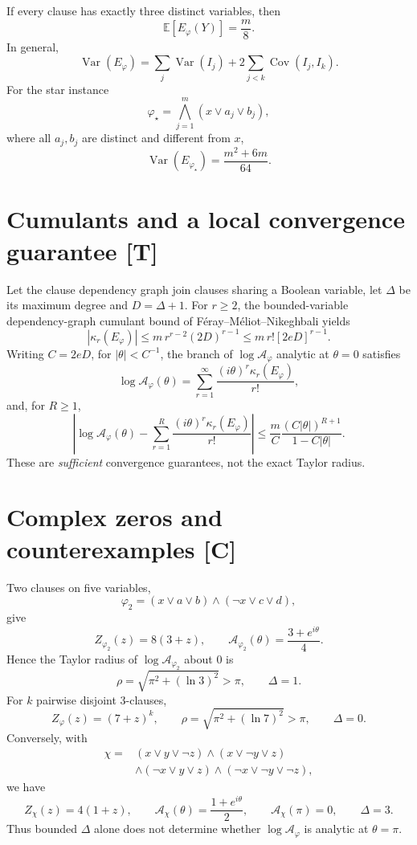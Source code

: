\documentclass[11pt]{article}
\newcommand{\E}{\mathbb{E}}
\DeclareMathOperator{\Var}{Var}
\DeclareMathOperator{\Cov}{Cov}
\begin{document}
If every clause has exactly three distinct variables, then
\[
\E[E_\varphi(Y)]=\frac m8.
\]
In general,
\[
\Var(E_\varphi)
=\sum_j\Var(I_j)+2\sum_{j<k}\Cov(I_j,I_k).
\]
For the star instance
\[
\varphi_\star=\bigwedge_{j=1}^{m}(x\lor a_j\lor b_j),
\]
where all $a_j,b_j$ are distinct and different from $x$,
\[
\Var(E_{\varphi_\star})
=\frac{m^2+6m}{64}.
\]

\section{Cumulants and a local convergence guarantee [T]}
Let the clause dependency graph join clauses sharing a Boolean
variable, let $\Delta$ be its maximum degree and $D=\Delta+1$.
For $r\ge2$, the bounded-variable dependency-graph cumulant
bound of F\'eray--M\'eliot--Nikeghbali yields
\[
|\kappa_r(E_\varphi)|
\le m\,r^{r-2}(2D)^{r-1}
\le m\,r![2eD]^{r-1}.
\]
Writing $C=2eD$, for $|\theta|<C^{-1}$, the branch of
$\log\mathcal{A}_\varphi$ analytic at $\theta=0$ satisfies
\[
\log\mathcal{A}_\varphi(\theta)
=\sum_{r=1}^{\infty}
\frac{(i\theta)^r\kappa_r(E_\varphi)}{r!},
\]
and, for $R\ge1$,
\[
\left|
\log\mathcal{A}_\varphi(\theta)
-\sum_{r=1}^{R}
\frac{(i\theta)^r\kappa_r(E_\varphi)}{r!}
\right|
\le
\frac{m}{C}
\frac{(C|\theta|)^{R+1}}{1-C|\theta|}.
\]
These are \emph{sufficient} convergence guarantees,
not the exact Taylor radius.

\section{Complex zeros and counterexamples [C]}
Two clauses on five variables,
\[
\varphi_2=(x\lor a\lor b)\land(\neg x\lor c\lor d),
\]
give
\[
Z_{\varphi_2}(z)=8(3+z),\qquad
\mathcal{A}_{\varphi_2}(\theta)=\frac{3+e^{i\theta}}4.
\]
Hence the Taylor radius of $\log\mathcal{A}_{\varphi_2}$
about $0$ is
\[
\rho=\sqrt{\pi^2+(\ln3)^2}>\pi,
\qquad\Delta=1.
\]
For $k$ pairwise disjoint 3-clauses,
\[
Z_\varphi(z)=(7+z)^k,\qquad
\rho=\sqrt{\pi^2+(\ln7)^2}>\pi,\qquad\Delta=0.
\]
Conversely, with
\[
\begin{aligned}
\chi={}&(x\lor y\lor\neg z)
\land(x\lor\neg y\lor z)\\
&\land(\neg x\lor y\lor z)
\land(\neg x\lor\neg y\lor\neg z),
\end{aligned}
\]
we have
\[
Z_\chi(z)=4(1+z),\qquad
\mathcal{A}_\chi(\theta)=\frac{1+e^{i\theta}}2,\qquad
\mathcal{A}_\chi(\pi)=0,\qquad\Delta=3.
\]
Thus bounded $\Delta$ alone does not determine whether
$\log\mathcal{A}_\varphi$ is analytic at $\theta=\pi$.
\end{document}
